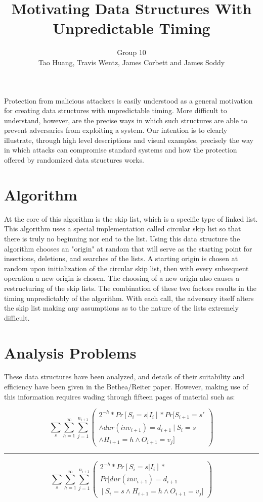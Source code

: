 \documentclass[11pt,twocolumn]{article}
\title{Motivating Data Structures With Unpredictable Timing}
\author{Group 10\\
\small{Tao Huang, Travis Wentz, James Corbett and James Soddy}}
\begin{document}
\maketitle

Protection from malicious attackers is easily understood as a general motivation
for creating data structures with unpredictable timing. More difficult to understand,
however, are the precise ways in which such structures are able to prevent adversaries
from exploiting a system. Our intention is to clearly illustrate, through
high level descriptions and visual examples, precisely the way in which attacks
can compromise standard systems and how the protection offered by randomized
data structures works.

\section{Algorithm}
 At the core of this algorithm is the skip list, which is a specific type of linked list. This algorithm uses a special implementation called circular skip list so that there is truly no beginning nor end to the list. Using this data structure the algorithm chooses an "origin" at random that will serve as the starting point for insertions, deletions, and searches of the lists. A starting origin is chosen at random upon initialization of the circular skip list, then with every subsequent operation a new origin is chosen. The choosing of a new origin also causes a restructuring of the skip lists. The combination of these two factors results in the timing unpredictably of the algorithm. With each call, the adversary itself alters the skip list making any assumptions as to the nature of the lists extremely difficult.
  
\section{Analysis Problems}
These data structures have been analyzed, and details of their suitability and
efficiency have been given in the Bethea/Reiter paper\cite{Bethea09}. However,
making use of this information requires wading through fifteen pages of material such as:

\begin{minipage}{.5\textwidth}

$$\sum_s\sum_{h=1}^\infty\sum_{j=1}^{n_{i+1}} \left( \begin{matrix}
2^{-h}*Pr[S_i=s | I_i]*Pr[S_{i+1}=s' \\ \land dur(inv_{i+1})=d_{i+1}\  
|\  S_i=s \\ \land H_{i+1}=h \land O_{i+1}=v_j] \end{matrix} \right)$$
\hrule
$$\sum_s\sum_{h=1}^\infty\sum_{j=1}^{n_{i+1}} 
\left( \begin{matrix}2^{-h}*Pr[S_i=s | I_i]*
\\Pr[ dur(inv_{i+1})=d_{i+1} \\ \  | \  S_i=s \land H_{i+1}=h \land O_{i+1}=v_j] \end{matrix} \right)$$

\end{minipage}
\end{document}
